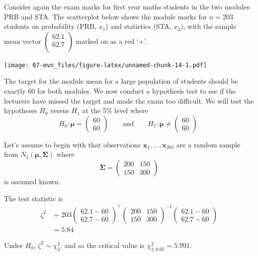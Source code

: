 \documentclass[
]{book}
\theoremstyle{definition}
\theoremstyle{definition}
\theoremstyle{definition}
\theoremstyle{definition}
\theoremstyle{remark}
\begin{document}
Consider again the exam marks for first year maths students in the two modules PRB and STA. The scatterplot below shows the module marks for \(n=203\) students on probability (PRB, \(x_1\)) and statistics (STA, \(x_2\)), with the sample mean vector \(\begin{pmatrix}62.1 \\62.7 \\\end{pmatrix}\) marked on as a red `+'.

\texttt{[image: 07-mvn\_files/figure-latex/unnamed-chunk-14-1.pdf]}

The target for the module mean for a large population of students should be exactly 60 for both modules. We now conduct a hypothesis test to see if the lecturers have missed the target and made the exam too difficult. We will test the hypotheses \(H_0\) versus \(H_1\) at the 5\% level where
\[
H_0: {\boldsymbol{\mu}}= \begin{pmatrix} 60 \\ 60 \end{pmatrix} \qquad \text{and} \qquad H_1: {\boldsymbol{\mu}}\neq \begin{pmatrix} 60 \\ 60 \end{pmatrix}.
\]

Let's assume to begin with that observations \(\mathbf x_1,\ldots,\mathbf x_{203}\) are a random sample from \(N_2({\boldsymbol{\mu}},\boldsymbol{\Sigma})\) where
\[
\boldsymbol{\Sigma}= \begin{pmatrix} 200 & 150 \\ 150 & 300 \end{pmatrix}
\]
is assumed known.

The test statistic is
\begin{align*}
\zeta^2 &= 203 \begin{pmatrix} 62.1 - 60 \\ 62.7 - 60 \end{pmatrix}^\top \begin{pmatrix} 200 & 150 \\ 150 & 300 \end{pmatrix}^{-1} \begin{pmatrix} 62.1 - 60 \\ 62.7 - 60 \end{pmatrix}\\
&=5.84
\end{align*}

Under \(H_0\), \(\zeta^2\sim \chi^2_2\). and so the critical value is \(\chi^2_{2,0.05} = 5.991\).
\end{document}
